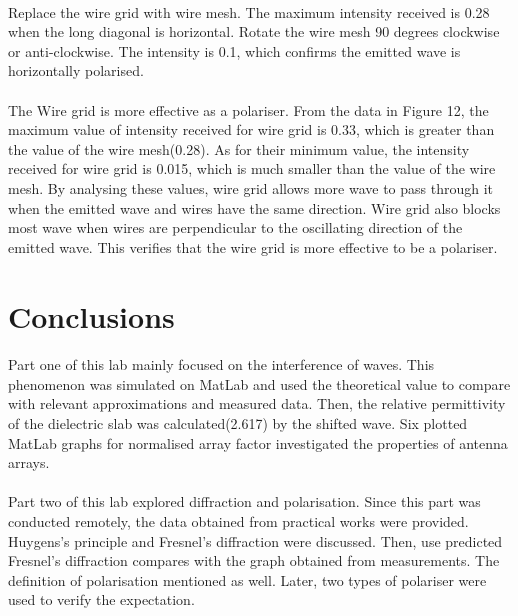 \documentclass[12pt]{article}
\begin{document}
    \paragraph{}
    Replace the wire grid with wire mesh. The maximum intensity received is 0.28 when the long diagonal is horizontal. Rotate the wire mesh 90 degrees clockwise or anti-clockwise. The intensity is 0.1, which confirms the emitted wave is horizontally polarised. 
    \paragraph{}
    The Wire grid is more effective as a polariser. From the data in Figure 12, the maximum value of intensity received for wire grid is 0.33, which is greater than the value of the wire mesh(0.28). As for their minimum value, the intensity received for wire grid is 0.015, which is much smaller than the value of the wire mesh. By analysing these values, wire grid allows more wave to pass through it when the emitted wave and wires have the same direction. Wire grid also blocks most wave when wires are perpendicular to the oscillating direction of the emitted wave. This verifies that the wire grid is more effective to be a polariser.

    \section{Conclusions}
    \paragraph{}
    Part one of this lab mainly focused on the interference of waves. This phenomenon was simulated on MatLab and used the theoretical value to compare with relevant approximations and measured data. Then, the relative permittivity of the dielectric slab was calculated(2.617) by the shifted wave. Six plotted MatLab graphs for normalised array factor investigated the properties of antenna arrays.
    
    \paragraph{}
    Part two of this lab explored diffraction and polarisation. Since this part was conducted remotely, the data obtained from practical works were provided. Huygens's principle and Fresnel's diffraction were discussed. Then, use predicted Fresnel's diffraction compares with the graph obtained from measurements. The definition of polarisation mentioned as well. Later, two types of polariser were used to verify the expectation.
    
\end{document}

